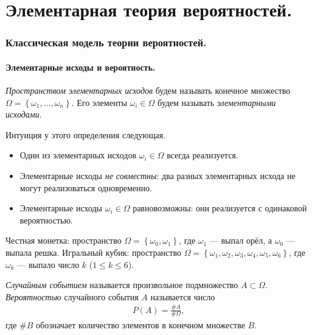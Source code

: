 \documentclass[../main.tex]{subfiles}
\begin{document}
\part{Элементарная теория вероятностей.}
\label{part:1:Elementary Probability Theory}

\section{Классическая модель теории вероятностей.}

\subsection{Элементарные исходы и вероятность.}
\label{subsection:def_of_elem_model}

\begin{df}
 \label{def:elementary_prob_space}
 \textit{Пространством элементарных исходов} будем называть конечное множество $\Omega = \left\{ \omega_1, \ldots, \omega_n \right\}$. Его элементы $ \omega_i \in \Omega $ будем называть \textit{элементарными исходами}.

 Интуиция у этого определения следующая.
 \begin{itemize}
  \item Один из элементарных исходов $ \omega_i \in \Omega $ всегда реализуется.
  \item Элементарные исходы \textit{не совместны}: два разных элементарных исхода не могут реализоваться одновременно.
  \item Элементарные исходы $ \omega_i\in\Omega $ равновозможны: они реализуется с одинаковой вероятностью.
 \end{itemize}
\end{df}
\begin{exmpl*}
 Честная монетка: пространство $ \Omega = \left\{ \omega_0, \omega_1 \right\} $, где $ \omega_1 $ --- выпал орёл, а $ \omega_0 $ --- выпала решка.
 Игральный кубик: пространство $ \Omega = \left\{ \omega_1, \omega_2, \omega_3, \omega_4, \omega_5, \omega_6 \right\} $, где $ \omega_k $ --- выпало число $ k $ ($ 1\leqslant k \leqslant 6 $).
\end{exmpl*}

\begin{df}
 \textit{Случайным событием} называется произвольное подмножество $A \subset \Omega$. \textit{Вероятностью} случайного события $A$ называется число
 \begin{align*}
  P(A) = \frac{\# A}{\# \Omega}
 ,\end{align*} где $\# B$ обозначает количество элементов в конечном множестве $B$.
\end{df}
\end{document}
